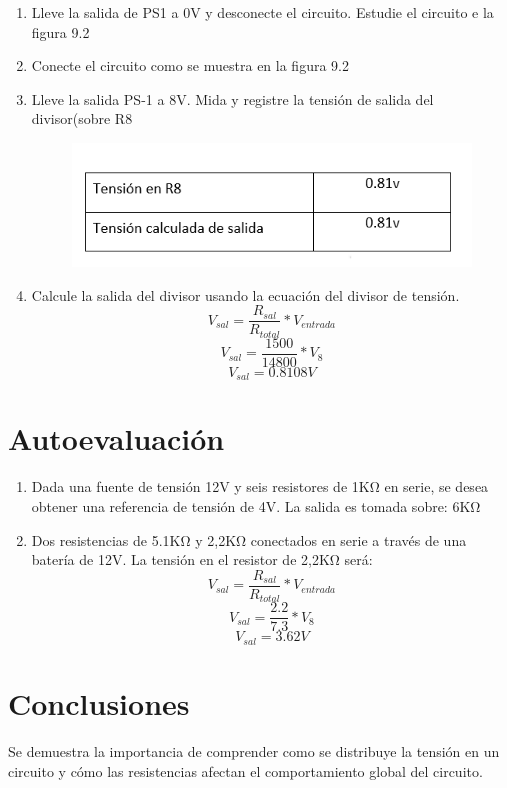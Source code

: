 \begin{enumerate}
\begin{figure}[h]
	\end{figure}
	\item 	Lleve la salida de PS1 a 0V y desconecte el circuito. Estudie el circuito e la figura 9.2
	\item	Conecte el circuito como se muestra en la figura 9.2
	\item	Lleve la salida PS-1 a 8V. Mida y registre la tensión de salida del divisor(sobre R8
	\begin{figure}[h]
		\centering
		\includegraphics[scale=1.2]{imagenes/3}
	\end{figure}
	\item 	Calcule la salida del divisor usando la ecuación del divisor de tensión.
	\begin{equation*}
		V_{sal}= \frac{R_{sal}}{R_{total}}*V_{entrada}
	\end{equation*}
	\begin{equation*}
		V_{sal}= \frac{1500}{14800}*V_{8}
	\end{equation*}
	\begin{equation*}
		V_{sal}=0.8108V
	\end{equation*}
\end{enumerate}
\section{Autoevaluación}
\begin{enumerate}
	\item 	Dada una fuente de tensión 12V y seis resistores de 1KΩ en serie, se desea obtener una referencia de tensión de 4V. La salida es tomada sobre:
	6KΩ
	\item	Dos resistencias de 5.1KΩ y 2,2KΩ conectados en serie a través de una batería de 12V. La tensión en el resistor de 2,2KΩ será:
		\begin{equation*}
		V_{sal}= \frac{R_{sal}}{R_{total}}*V_{entrada}
	\end{equation*}
	\begin{equation*}
		V_{sal}= \frac{2.2}{7.3}*V_{8}
	\end{equation*}
	\begin{equation*}
		V_{sal}=3.62V
	\end{equation*}
	
\end{enumerate}
\section{Conclusiones}
Se demuestra la importancia de comprender como se distribuye la tensión en un circuito y cómo las resistencias afectan el comportamiento global del circuito.


